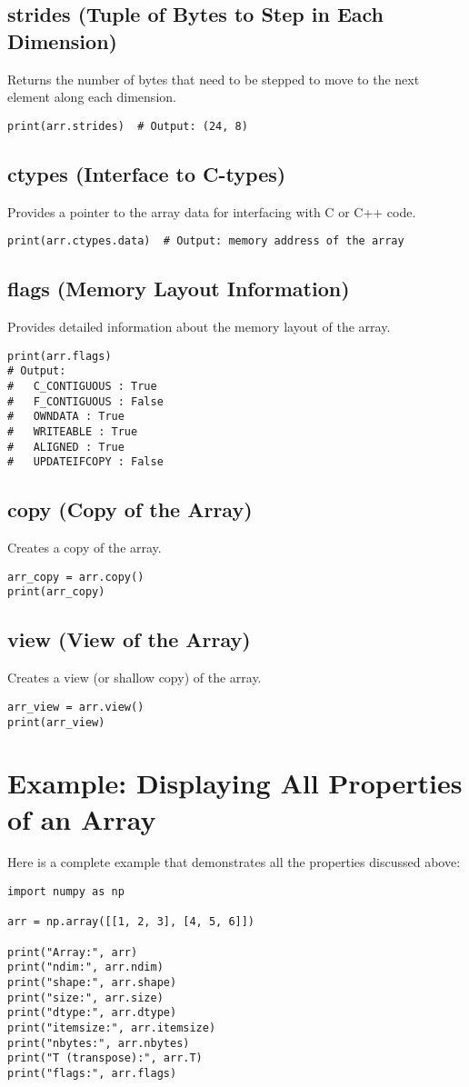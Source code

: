 \documentclass[a4paper, 12pt]{article}
\begin{document}
\subsection{strides (Tuple of Bytes to Step in Each Dimension)}
Returns the number of bytes that need to be stepped to move to the next element along each dimension.
\begin{lstlisting}
print(arr.strides)  # Output: (24, 8)
\end{lstlisting}

\subsection{ctypes (Interface to C-types)}
Provides a pointer to the array data for interfacing with C or C++ code.
\begin{lstlisting}
print(arr.ctypes.data)  # Output: memory address of the array
\end{lstlisting}

\subsection{flags (Memory Layout Information)}
Provides detailed information about the memory layout of the array.
\begin{lstlisting}
print(arr.flags)
# Output:
#   C_CONTIGUOUS : True
#   F_CONTIGUOUS : False
#   OWNDATA : True
#   WRITEABLE : True
#   ALIGNED : True
#   UPDATEIFCOPY : False
\end{lstlisting}

\subsection{copy (Copy of the Array)}
Creates a copy of the array.
\begin{lstlisting}
arr_copy = arr.copy()
print(arr_copy)
\end{lstlisting}

\subsection{view (View of the Array)}
Creates a view (or shallow copy) of the array.
\begin{lstlisting}
arr_view = arr.view()
print(arr_view)
\end{lstlisting}

\section{Example: Displaying All Properties of an Array}
Here is a complete example that demonstrates all the properties discussed above:
\begin{lstlisting}
import numpy as np

arr = np.array([[1, 2, 3], [4, 5, 6]])

print("Array:", arr)
print("ndim:", arr.ndim)
print("shape:", arr.shape)
print("size:", arr.size)
print("dtype:", arr.dtype)
print("itemsize:", arr.itemsize)
print("nbytes:", arr.nbytes)
print("T (transpose):", arr.T)
print("flags:", arr.flags)
\end{lstlisting}
\end{document}
